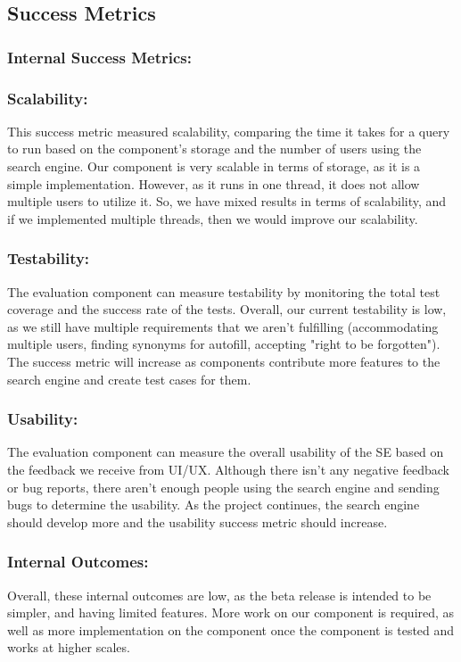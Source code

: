 \pagebreak
\subsection*{Success Metrics}

\subsubsection*{Internal Success Metrics:}

\medskip\subsubsection*{Scalability:}
This success metric measured scalability, comparing the time it takes for a query 
to run based on the component's storage and the number of users using the search 
engine. Our component is very scalable in terms of storage, as it is a simple 
implementation. However, as it runs in one thread, it does not allow multiple 
users to utilize it. So, we have mixed results in terms of scalability, and if we 
implemented multiple threads, then we would improve our scalability.

\smallskip\subsubsection*{Testability:}
The evaluation component can measure testability by monitoring the total test 
coverage and the success rate of the tests. Overall, our current testability is 
low, as we still have multiple requirements that we aren't fulfilling 
(accommodating multiple users, finding synonyms for autofill, accepting "right to 
be forgotten"). The success metric will increase as components contribute more 
features to the search engine and create test cases for them.

\smallskip\subsubsection*{Usability:}
The evaluation component can measure the overall usability of the SE based on the 
feedback we receive from UI/UX. Although there isn't any negative feedback or bug 
reports, there aren't enough people using the search engine and sending bugs to 
determine the usability. As the project continues, the search engine should 
develop more and the usability success metric should increase. 

\subsubsection*{Internal Outcomes:}
Overall, these internal outcomes are low, as the beta release is intended to be
simpler, and having limited features. More work on our component is required, 
as well as more implementation on the component once the component is tested
and works at higher scales.


